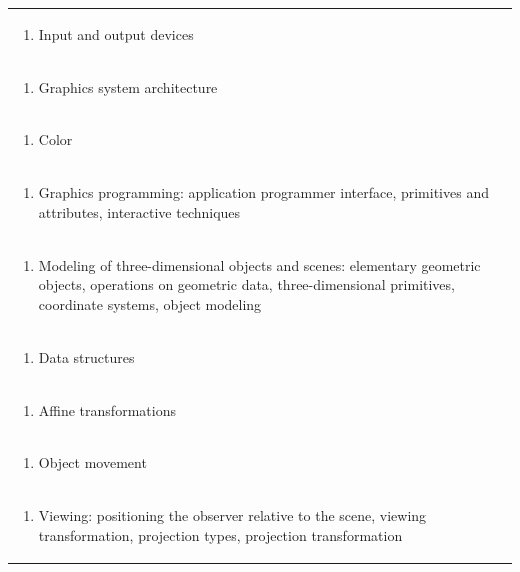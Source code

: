 \documentclass[11pt]{article}
\begin{document}
\begin{center}
\begin{longtable}{|p{4cm}|p{4cm}|p{4cm}|p{4cm}|}
\multicolumn{4}{|p{\dimexpr 16cm + 6\tabcolsep\relax}|}{\begin{enumerate}[start=2]\item Input and output devices\end{enumerate}}\\
\multicolumn{4}{|p{\dimexpr 16cm + 6\tabcolsep\relax}|}{\begin{enumerate}[start=3]\item Graphics system architecture\end{enumerate}}\\
\multicolumn{4}{|p{\dimexpr 16cm + 6\tabcolsep\relax}|}{\begin{enumerate}[start=4]\item Color\end{enumerate}}\\
\multicolumn{4}{|p{\dimexpr 16cm + 6\tabcolsep\relax}|}{\begin{enumerate}[start=5]\item Graphics programming: application programmer interface, primitives and attributes, interactive techniques\end{enumerate}}\\
\multicolumn{4}{|p{\dimexpr 16cm + 6\tabcolsep\relax}|}{\begin{enumerate}[start=6]\item Modeling of three-dimensional objects and scenes: elementary geometric objects, operations on geometric data, three-dimensional primitives, coordinate systems, object modeling\end{enumerate}}\\
\multicolumn{4}{|p{\dimexpr 16cm + 6\tabcolsep\relax}|}{\begin{enumerate}[start=7]\item Data structures\end{enumerate}}\\
\multicolumn{4}{|p{\dimexpr 16cm + 6\tabcolsep\relax}|}{\begin{enumerate}[start=8]\item Affine transformations\end{enumerate}}\\
\multicolumn{4}{|p{\dimexpr 16cm + 6\tabcolsep\relax}|}{\begin{enumerate}[start=9]\item Object movement\end{enumerate}}\\
\multicolumn{4}{|p{\dimexpr 16cm + 6\tabcolsep\relax}|}{\begin{enumerate}[start=10]\item Viewing: positioning the observer relative to the scene, viewing transformation, projection types, projection transformation\end{enumerate}}\\

\end{longtable}
\end{center}
\end{document}
